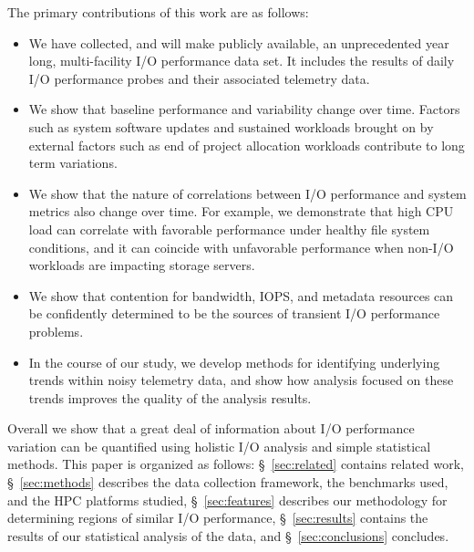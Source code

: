 The primary contributions of this work are as follows: 
\begin{itemize}[leftmargin=*]
\item We have collected, and will make publicly available, an unprecedented year long, multi-facility
I/O performance data set. It includes the results of daily I/O performance
probes and their associated telemetry data.
\item We show that baseline performance and variability change over time.
Factors such as system software updates and sustained workloads brought on
by external factors such as end of project allocation workloads contribute to long term variations. 
% 
% 
\item We show that the nature of correlations between I/O performance and system metrics also change over
time. For example, we demonstrate that high CPU load can correlate with favorable performance under healthy file system conditions, and it can coincide with unfavorable performance when non-I/O workloads are impacting storage servers.
\item We show that contention for bandwidth, IOPS, and metadata resources can be confidently determined to be the sources of transient I/O performance problems.
\item In the course of our study, we develop methods for identifying
underlying trends within noisy telemetry data, and show how analysis focused
on these trends improves the quality of the analysis results.
\end{itemize}
Overall we show that a great deal of information about I/O performance variation can be quantified using holistic I/O analysis and simple statistical methods.
This paper is organized as follows: \S~\ref{sec:related} contains related work, \S~\ref{sec:methods} describes the data collection framework, the benchmarks used, and the HPC platforms studied, \S~\ref{sec:features} describes our methodology for determining regions of similar I/O performance, \S~\ref{sec:results} contains the results of our statistical analysis of the data, and \S~\ref{sec:conclusions} concludes. 

